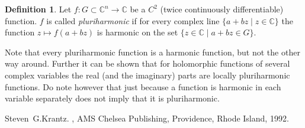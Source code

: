 \documentclass[12pt]{article}
\theoremstyle{theorem}
\theoremstyle{definition}
\newtheorem*{defn}{Definition}
\begin{document}
\begin{defn}
Let $f \colon G \subset {\mathbb{C}}^n \to {\mathbb{C}}$ be a $C^2$ (twice continuously differentiable) function.  $f$ is called {\em pluriharmonic}
if for every complex line $\{ a + b z \mid z \in {\mathbb{C}} \}$
the function $z \mapsto f(a + bz)$ is harmonic on the set
$\{ z \in {\mathbb{C}} \mid a + b z \in G \}$.
\end{defn}

Note that every pluriharmonic function is a harmonic function, but not the other way around.  Further it can be shown that for holomorphic functions of several complex variables the real (and the imaginary) parts are locally pluriharmonic functions.  Do note however that just because a function is harmonic in each variable separately does not imply that it is pluriharmonic.

\begin{thebibliography}{9}
Steven~G.\@ Krantz.
{\em {}},
AMS Chelsea Publishing, Providence, Rhode Island, 1992.
\end{thebibliography}
\end{document}
